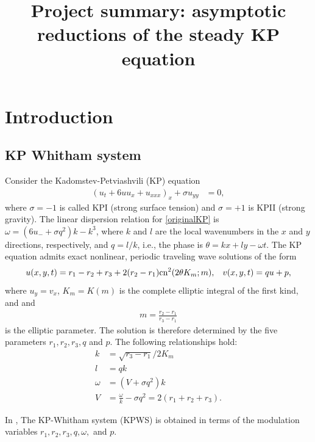 \documentclass[12pt]{article}
\title{Project summary: asymptotic reductions of the steady KP equation}
\author{\vspace{-1in}}
\date{\vspace{-1in}}
\numberwithin{equation}{section}
\begin{document}
\maketitle
\tableofcontents
\pagebreak

\section{Introduction}
\subsection{KP Whitham system}

Consider the  Kadomstev-Petviashvili (KP)
equation \cite{kp1970}
\begin{align}
  \label{eq:1}
  (u_t + 6 uu_x + u_{xxx})_x + \sigma u_{yy} &= 0,
\end{align}\label{originalKP}
where $\sigma = -1$ is called KPI (strong surface tension) and
$\sigma = +1$ is KPII (strong gravity). The linear dispersion relation for \eqref{originalKP} is
$\omega = (6u_-+\sigma q^2)k-k^3$, where $k$ and $l$ are the local
wavenumbers in the $x$ and $y$ directions, respectively, and $q=l/k$,
i.e., the phase is $\theta = k x + l y - \omega t$. The KP equation
admits exact nonlinear, periodic traveling wave solutions of the form
\begin{align}
    u (x,y,t) = r_1 - r_2 + r_3 +2(r_2-r_1)\text{cn}^2(2\theta K_m;m), \hspace{3mm}  v(x,y,t)=  qu+p, \label{exactsol}
\end{align}
where $ u_y = v_x$, $K_m=K(m)$ is the complete elliptic integral of the first kind, and 
and
\begin{align}
    m = \frac{r_2-r_1}{r_3-r_1} \label{mrule}
\end{align}
is the elliptic parameter. The solution is therefore determined by the
five parameters $r_1,r_2,r_3,q$ and $p$. The following relationships
hold:
\begin{subequations}
\begin{align}
    k &= \sqrt{r_3-r_1}/2K_m \label{keqxn} \\
    l &= qk \label{leqxn}\\
    \omega &= (V+\sigma q^2)k \\
    V&= \frac{\omega}{k} - \sigma q^2 = 2(r_1+r_2+r_3).
\end{align}
\end{subequations}

In \cite{ablowitz2017whitham}, The KP-Whitham system (KPWS) is obtained in terms of the modulation variables $r_1,r_2,r_3,q, \omega,$ and $p$. 
\end{document}
